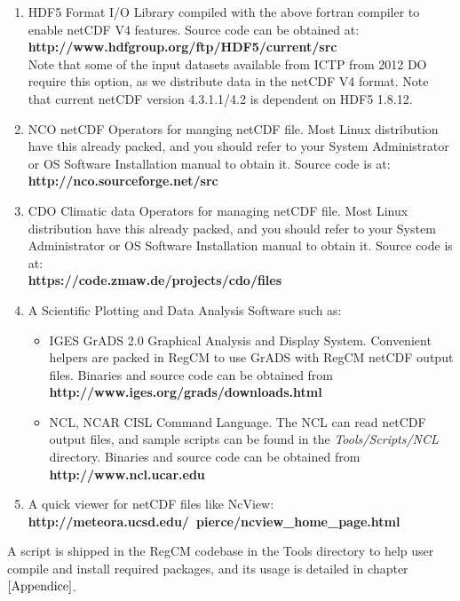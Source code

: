 \begin{enumerate}
\item HDF5 Format I/O Library compiled with the above fortran compiler to
enable netCDF V4 features. Source code can be obtained at: \\
{\bf http://www.hdfgroup.org/ftp/HDF5/current/src} \\
Note that some of the input datasets available from ICTP from 2012 DO require
this option, as we distribute data in the netCDF V4 format.
Note that current netCDF version 4.3.1.1/4.2 is dependent on HDF5 1.8.12.
\item NCO netCDF Operators for manging netCDF file. Most Linux distribution
have this already packed, and you should refer to your System Administrator or
OS Software Installation manual to obtain it. Source code is at: \\
{\bf http://nco.sourceforge.net/src}
\item CDO Climatic data Operators for managing netCDF file. Most Linux
distribution have this already packed, and you should refer to your System
Administrator or OS Software Installation manual to obtain it.
Source code is at: \\
{\bf https://code.zmaw.de/projects/cdo/files}
\item A Scientific Plotting and Data Analysis Software such as:
\begin{itemize}
\item IGES GrADS 2.0 Graphical Analysis and Display System. Convenient helpers
are packed in RegCM to use GrADS with RegCM netCDF output files.
Binaries and source code can be obtained from \\
{\bf http://www.iges.org/grads/downloads.html}
\item NCL, NCAR CISL Command Language. The NCL can read netCDF output files, and
sample scripts can be found in the {\em Tools/Scripts/NCL} directory.
Binaries and source code can be obtained from \\
{\bf http://www.ncl.ucar.edu}
\end{itemize}
\item A quick viewer for netCDF files like NcView: \\
{\bf http://meteora.ucsd.edu/~pierce/ncview\_home\_page.html}
\end{enumerate}

A script is shipped in the RegCM codebase in the Tools directory to help
user compile and install required packages, and its usage is detailed in
chapter $\ref{Appendice}$.

